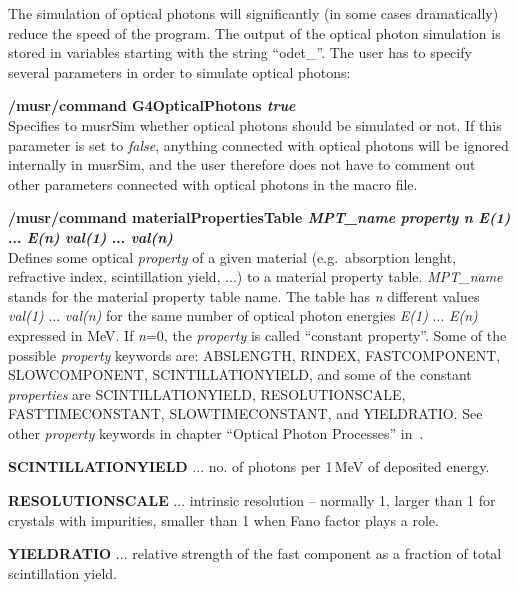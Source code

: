\documentclass[twoside]{dis04}
\begin{document}
The simulation of optical photons will significantly (in some cases dramatically)
reduce the speed of the program.  The output of the optical photon simulation is stored
in variables starting with the string ``odet\_''.  The user has to specify several parameters
in order to simulate optical photons:
%
\begin{description}
\item{\bf /musr/command G4OpticalPhotons \emph{true}}\\
        Specifies to musrSim whether optical photons should be simulated or not.
	If this parameter is set to \emph{false}, anything connected with optical photons
        will be ignored internally in musrSim, and the user therefore does not have to
        comment out other parameters connected with optical photons in the macro file.

 \item{\bf /musr/command materialPropertiesTable \emph{MPT\_name} \emph{property} \emph{n}  
        \emph{E(1)} ... \emph{E(n)}  \emph{val(1)} ... \emph{val(n)} } \\
        Defines some optical \emph{property} of a given material (e.g.\ absorption lenght, 
	refractive index, scintillation yield, ...) to a material property table.
        \emph{MPT\_name} stands for the material property table name.  The table has
	\emph{n} different values \emph{val(1)} ... \emph{val(n)} for the same number
	of optical photon energies \emph{E(1)} ... \emph{E(n)} expressed in MeV.
	If \emph{n}=0, the \emph{property} is called ``constant property''.
	Some of the possible \emph{property} keywords are: ABSLENGTH, RINDEX, FASTCOMPONENT, SLOWCOMPONENT,
	SCINTILLATIONYIELD, and some of the constant \emph{properties} are SCINTILLATIONYIELD, RESOLUTIONSCALE, 
	FASTTIMECONSTANT, SLOWTIMECONSTANT, and YIELDRATIO.  See other \emph{property} keywords
	in chapter ``Optical Photon Processes'' in~\cite{geantUserManual}.\\
	\begin{description}
	\item{\bf SCINTILLATIONYIELD} ... no. of photons per 1\,MeV of deposited energy.
	\item{\bf RESOLUTIONSCALE} ... intrinsic resolution -- normally 1, larger than 
	  1 for crystals with impurities, smaller than 1 when Fano factor plays a role.
	\item{\bf YIELDRATIO} ... relative strength of the fast component as a fraction
	  of total scintillation yield.
	\end{description}


\end{description}
\end{document}
